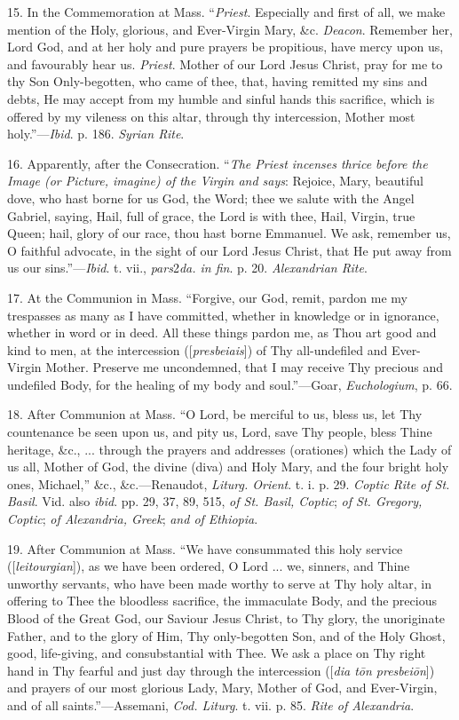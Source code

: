 15. In the Commemoration at Mass. ``\emph{Priest}. Especially and
first of all, we make mention of the Holy, glorious, and Ever-Virgin
Mary, \&c. \emph{Deacon}. Remember her, Lord God, and at her holy and
pure prayers be propitious, have mercy upon us, and favourably hear us. \emph{Priest}.
Mother of our Lord Jesus Christ, pray for me to thy Son Only-begotten,
who came of thee, that, having remitted my sins and debts, He may accept
from my humble and sinful hands this sacrifice, which is offered by my
vileness on this altar, through thy intercession, Mother most
holy.''—\emph{Ibid}. p. 186. \emph{Syrian Rite}.


16. Apparently, after the Consecration. ``\emph{The Priest incenses
thrice before the Image (or Picture, imagine) of the Virgin and says}:
Rejoice, Mary, beautiful dove, who hast borne for us God, the
Word; thee we salute with the Angel Gabriel, saying, Hail, full of
grace, the Lord is with thee, Hail, Virgin, true Queen; hail, glory of
our race, thou hast borne Emmanuel. We ask, remember us, O faithful
advocate, in the sight of our Lord Jesus Christ, that He put away from
us our sins.''—\emph{Ibid}. t. vii., \emph{pars}2\emph{da. in fin}. p.
20. \emph{Alexandrian Rite}.


17. At the Communion in Mass. ``Forgive, our God, remit, pardon
me my trespasses as many as I have committed, whether in knowledge or in
ignorance, whether in word or in deed. All these things pardon me, as
Thou art good and kind to men, at the intercession ([\emph{presbeiais}])
of Thy all-undefiled and Ever-Virgin Mother. Preserve me uncondemned,
that I may receive Thy precious and undefiled Body, for the healing of
my body and soul.''—Goar, \emph{Euchologium}, p. 66.


18. After Communion at Mass. ``O Lord, be merciful to us, bless
us, let Thy countenance be seen upon us, and pity us, Lord, save Thy
people, bless Thine heritage, \&c., ... through the prayers and addresses (orationes)
which the Lady of us all, Mother of God, the divine (diva) and Holy
Mary, and the four bright holy ones, Michael,'' \&c., \&c.—Renaudot,
\emph{Liturg. Orient}. t. i. p. 29. \emph{Coptic Rite of St. Basil}. Vid.
also \emph{ibid}. pp. 29, 37, 89, 515, \emph{of St. Basil, Coptic}; \emph{of
St. Gregory, Coptic}; \emph{of Alexandria, Greek}; \emph{and of Ethiopia}.


19. After Communion at Mass. ``We have consummated this holy
service ([\emph{leitourgian}]), as we have been ordered, O Lord ... we,
sinners, and Thine unworthy servants, who have been made worthy to serve
at Thy holy altar, in offering to Thee the bloodless sacrifice, the
immaculate Body, and the precious Blood of the Great God, our
Saviour Jesus Christ, to Thy glory, the unoriginate Father, and to the
glory of Him, Thy only-begotten Son, and of the Holy Ghost, good,
life-giving, and consubstantial with Thee. We ask a place on Thy right
hand in Thy fearful and just day through the intercession ([\emph{dia t\={o}n
presbei\={o}n}]) and prayers of our most glorious Lady, Mary,
Mother of God, and Ever-Virgin, and of all saints.''—Assemani, \emph{Cod.
Liturg}. t. vii. p. 85. \emph{Rite of Alexandria}.


